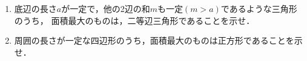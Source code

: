 \documentclass[../../main.tex]{subfiles}
\begin{document}
\begin{enumerate}
  \item 底辺の長さ$a$が一定で，他の2辺の和$m$も一定$(m>a)$であるような三角形のうち，
    面積最大のものは，二等辺三角形であることを示せ．
  \item 周囲の長さが一定な四辺形のうち，面積最大のものは正方形であることを示せ．
\end{enumerate}
\end{document}
